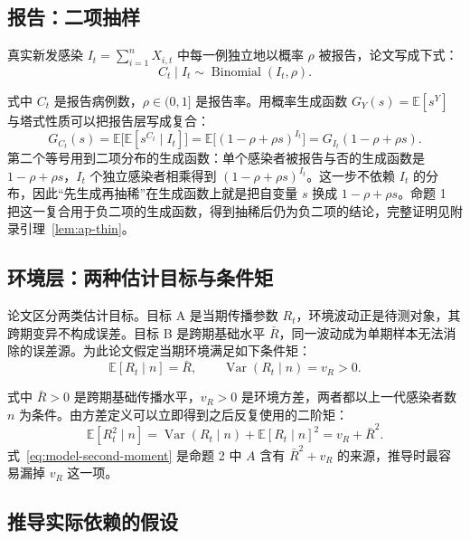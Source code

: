 \subsection{报告：二项抽样}

真实新发感染 $I_t=\sum_{i=1}^nX_{i,t}$ 中每一例独立地以概率 $\rho$ 被报告，论文写成下式：
\begin{equation*}
C_t \mid I_t \sim \operatorname{Binomial}(I_t, \rho). \tag{原文式 2}
\end{equation*}

式中 $C_t$ 是报告病例数，$\rho\in(0,1]$ 是报告率。用概率生成函数 $G_Y(s)=\mathbb{E}[s^Y]$ 与塔式性质可以把报告层写成复合：
\begin{equation*}
G_{C_t}(s)=\mathbb{E}\big[\mathbb{E}[s^{C_t}\mid I_t]\big]=\mathbb{E}\big[(1-\rho+\rho s)^{I_t}\big]=G_{I_t}(1-\rho+\rho s).
\end{equation*}
第二个等号用到二项分布的生成函数：单个感染者被报告与否的生成函数是 $1-\rho+\rho s$，$I_t$ 个独立感染者相乘得到 $(1-\rho+\rho s)^{I_t}$。这一步不依赖 $I_t$ 的分布，因此“先生成再抽稀”在生成函数上就是把自变量 $s$ 换成 $1-\rho+\rho s$。命题 1 把这一复合用于负二项的生成函数，得到抽稀后仍为负二项的结论，完整证明见附录引理~\ref{lem:ap-thin}。

\subsection{环境层：两种估计目标与条件矩}

论文区分两类估计目标。目标 A 是当期传播参数 $R_t$，环境波动正是待测对象，其跨期变异不构成误差。目标 B 是跨期基础水平 $\bar R$，同一波动成为单期样本无法消除的误差源。为此论文假定当期环境满足如下条件矩：
\begin{equation*}
\mathbb{E}[R_t \mid n] = \bar{R}, \qquad \operatorname{Var}(R_t \mid n) = v_R > 0. \tag{原文式 3}
\end{equation*}

式中 $\bar R>0$ 是跨期基础传播水平，$v_R>0$ 是环境方差，两者都以上一代感染者数 $n$ 为条件。由方差定义可以立即得到之后反复使用的二阶矩：
\begin{equation}
\mathbb{E}[R_t^2\mid n]=\operatorname{Var}(R_t\mid n)+\mathbb{E}[R_t\mid n]^2=v_R+\bar R^2.
\label{eq:model-second-moment}
\end{equation}
式~\eqref{eq:model-second-moment} 是命题 2 中 $A$ 含有 $\bar R^2+v_R$ 的来源，推导时最容易漏掉 $v_R$ 这一项。

\subsection{推导实际依赖的假设}


